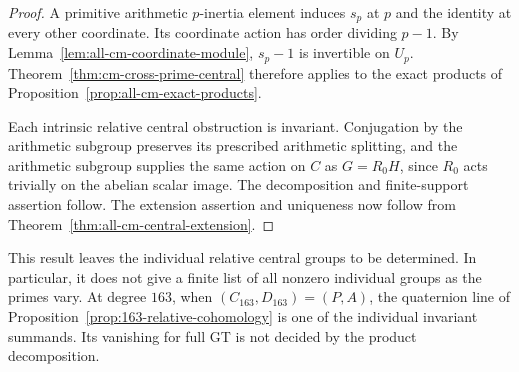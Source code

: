 \begin{proof}
A primitive arithmetic \(p\)-inertia element induces \(s_p\)
at \(p\) and the identity at every other coordinate. Its coordinate
action has order dividing \(p-1\). By
Lemma~\ref{lem:all-cm-coordinate-module}, \(s_p-1\) is invertible
on \(U_p\). Theorem~\ref{thm:cm-cross-prime-central} therefore
applies to the exact products of
Proposition~\ref{prop:all-cm-exact-products}.

Each intrinsic relative central obstruction is invariant. Conjugation
by the arithmetic subgroup preserves its prescribed arithmetic
splitting, and the arithmetic subgroup supplies the same action on
\(C\) as \(G=R_0H\), since \(R_0\) acts trivially on the
abelian scalar image. The decomposition and finite-support assertion
follow. The extension assertion and uniqueness now follow from
Theorem~\ref{thm:all-cm-central-extension}.
\end{proof}

This result leaves the individual relative central groups to be
determined. In particular, it does not give a finite list of all
nonzero individual groups as the primes vary. At degree \(163\),
when \((C_{163},D_{163})=(P,A)\), the quaternion line of
Proposition~\ref{prop:163-relative-cohomology} is one of the
individual invariant summands. Its vanishing for full GT is not
decided by the product decomposition.
